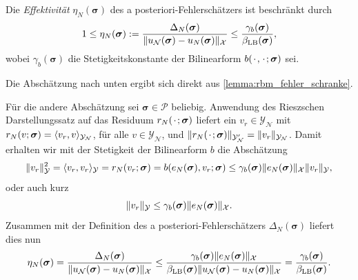 \documentclass[../main.tex]{subfiles}
\begin{document}
\begin{Lemma}
\label{lemma:effektivitaet}
    Die \emph{Effektivität} $\eta_{N}(\bm \sigma)$ des a posteriori-Fehlerschätzers ist beschränkt durch
    \begin{equation}
        1 \leq \eta_{N}(\bm \sigma) := \frac{\Delta_{N}(\bm \sigma)}{\lVert u_{\mathcal N}(\bm \sigma) - u_{N}(\bm \sigma)\rVert_{\mathcal X}} \leq \frac{\gamma_{b}(\bm \sigma)}{\beta_{\mathrm{LB}}(\bm \sigma)},
    \end{equation}
    wobei $\gamma_{b}(\bm \sigma)$ die Stetigkeitskonstante der Bilinearform $b({\mkern2mu\cdot\mkern2mu}, {\mkern2mu\cdot\mkern2mu}; \bm \sigma)$ sei.

    \begin{Beweis}
        Die Abschätzung nach unten ergibt sich direkt aus \cref{lemma:rbm_fehler_schranke}.

        Für die andere Abschätzung sei $\bm \sigma \in \mathcal P$ beliebig.
        Anwendung des Rieszschen Darstellungssatz auf das Residuum $r_{N}({\mkern2mu\cdot\mkern2mu}; \bm \sigma)$ liefert ein $v_{r} \in \mathcal Y_{\mathcal N}$ mit $r_{N}(v; \bm \sigma) = \langle v_{r},v\rangle_{\mathcal Y_{\mathcal N}}$, für alle $v \in \mathcal Y_{\mathcal N}$, und $\lVert r_{N}({\mkern2mu\cdot\mkern2mu}; \bm \sigma)\rVert_{\mathcal Y_{\mathcal N}'} = \lVert v_{r}\rVert_{\mathcal Y_{\mathcal N}}$.
        Damit erhalten wir mit der Stetigkeit der Bilinearform $b$ die Abschätzung
        \begin{equation}
            \lVert v_{r}\rVert_{\mathcal Y}^{2}
            = \langle v_{r},v_{r}\rangle_{\mathcal Y}
            = r_{N}(v_{r}; \bm \sigma)
            = b(e_{N}(\bm \sigma), v_{r}; \bm \sigma)
            \leq \gamma_{b}(\bm \sigma) \lVert e_{N}(\bm \sigma)\rVert_{\mathcal X} \lVert v_{r}\rVert_{\mathcal Y},
        \end{equation}
        oder auch kurz
        \begin{equation}
            \lVert v_{r}\rVert_{\mathcal Y} \leq \gamma_{b}(\bm \sigma) \lVert e_{N}(\bm \sigma)\rVert_{\mathcal X}.
        \end{equation}
        Zusammen mit der Definition des a posteriori-Fehlerschätzers $\Delta_{N}(\bm \sigma)$ liefert dies nun
        \begin{equation}
            \eta_{N}(\bm \sigma)
            = \frac{\Delta_{N}(\bm \sigma)}{\lVert u_{\mathcal N}(\bm \sigma) - u_{N}(\bm \sigma)\rVert_{\mathcal X}}
            \leq \frac{\gamma_{b}(\bm \sigma) \lVert e_{N}(\bm \sigma)\rVert_{\mathcal X}}{\beta_{\mathrm{LB}}(\bm \sigma)\lVert u_{\mathcal N}(\bm \sigma) - u_{N}(\bm \sigma)\rVert_{\mathcal X}}
            = \frac{\gamma_{b}(\bm \sigma)}{\beta_{\mathrm{LB}}(\bm \sigma)}.
        \end{equation}
    \end{Beweis}
\end{Lemma}
\end{document}
